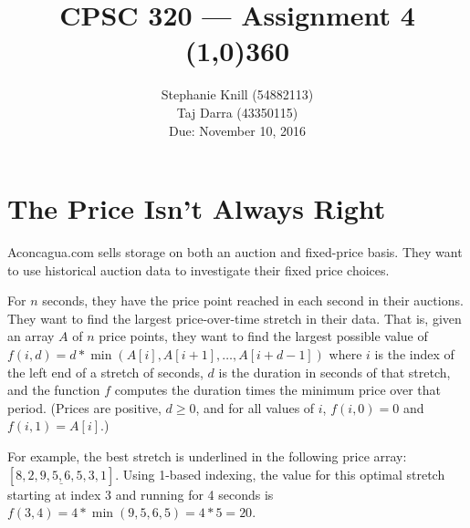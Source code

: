 \documentclass[11pt, oneside]{article}   	%
\theoremstyle{definition}
\theoremstyle{remark}
\begin{document}
\title{CPSC 320 --- Assignment 4 \\
\line(1,0){360} \\              %
}
\author{
Stephanie Knill (54882113) \\
Taj Darra (43350115) \\
Due: November 10, 2016}

\date{}                   %
\maketitle




\section{The Price Isn't Always Right}
\label{sec-1}

Aconcagua.com sells storage on both an auction and fixed-price
basis. They want to use historical auction data to investigate their
fixed price choices.

For $n$ seconds, they have the price point reached in each second in
their auctions. They want to find the largest price-over-time stretch
in their data. That is, given an array $A$ of $n$ price points, they
want to find the largest possible value of $f(i,d) =
d*\min(A[i],A[i+1],\ldots,A[i+d-1])$ where $i$ is the index of
the left end of a stretch of seconds, $d$ is the duration in seconds
of that stretch, and the function $f$ computes the duration times the
minimum price over that period. (Prices are positive, $d \geq 0$, and
for all values of $i$, $f(i,0) = 0$ and $f(i,1) = A[i]$.)

For example, the best stretch is underlined in the following price
array: $[8, 2, \underline{9, 5, 6, 5}, 3, 1]$. Using 1-based indexing,
the value for this optimal stretch starting at index 3 and running for
4 seconds is $f(3,4) = 4*\min(9, 5, 6, 5) = 4*5 = 20$.
\end{document}
